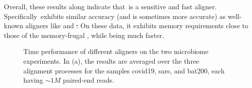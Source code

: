 Overall, these results along indicate that~\puffaligner is a
sensitive and fast aligner. Specifically~\puffaligner exhibits similar 
accuracy (and is sometimes more accurate) as well-known aligners like \bt and \st. 
On these data, it exhibits memory requirements close to those of the memory-frugal \bt, 
while being much faster.
\begin{figure}%
    \centering
    \hfill
    \caption[Time performance of different aligners on the microbiome
    experiments]{Time performance of different aligners on the two microbiome
    experiments. In (a), the results are averaged
    over the three alignment processes for the samples covid19, sars, and
    bat200, each having $\sim1M$ paired-end reads.
}
\end{figure}
